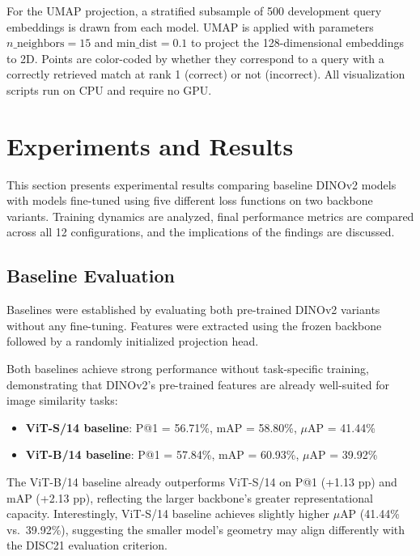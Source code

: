 \documentclass[
    english,
]{VUMIFPSbakalaurinis}
\begin{document}
For the UMAP projection, a stratified subsample of 500 development query embeddings is drawn from each model. UMAP is applied with parameters $n\_\text{neighbors} = 15$ and $\text{min\_dist} = 0.1$ to project the 128-dimensional embeddings to 2D. Points are color-coded by whether they correspond to a query with a correctly retrieved match at rank 1 (correct) or not (incorrect). All visualization scripts run on CPU and require no GPU.

\section{Experiments and Results}

This section presents experimental results comparing baseline DINOv2 models with models fine-tuned using five different loss functions on two backbone variants. Training dynamics are analyzed, final performance metrics are compared across all 12 configurations, and the implications of the findings are discussed.

\subsection{Baseline Evaluation}

Baselines were established by evaluating both pre-trained DINOv2 variants without any fine-tuning. Features were extracted using the frozen backbone followed by a randomly initialized projection head.

Both baselines achieve strong performance without task-specific training, demonstrating that DINOv2's pre-trained features are already well-suited for image similarity tasks:
\begin{itemize}
    \item \textbf{ViT-S/14 baseline}: P@1 = 56.71\%, mAP = 58.80\%, $\mu$AP = 41.44\%
    \item \textbf{ViT-B/14 baseline}: P@1 = 57.84\%, mAP = 60.93\%, $\mu$AP = 39.92\%
\end{itemize}

The ViT-B/14 baseline already outperforms ViT-S/14 on P@1 (+1.13 pp) and mAP (+2.13 pp), reflecting the larger backbone's greater representational capacity. Interestingly, ViT-S/14 baseline achieves slightly higher $\mu$AP (41.44\% vs.\ 39.92\%), suggesting the smaller model's geometry may align differently with the DISC21 evaluation criterion.
\end{document}
